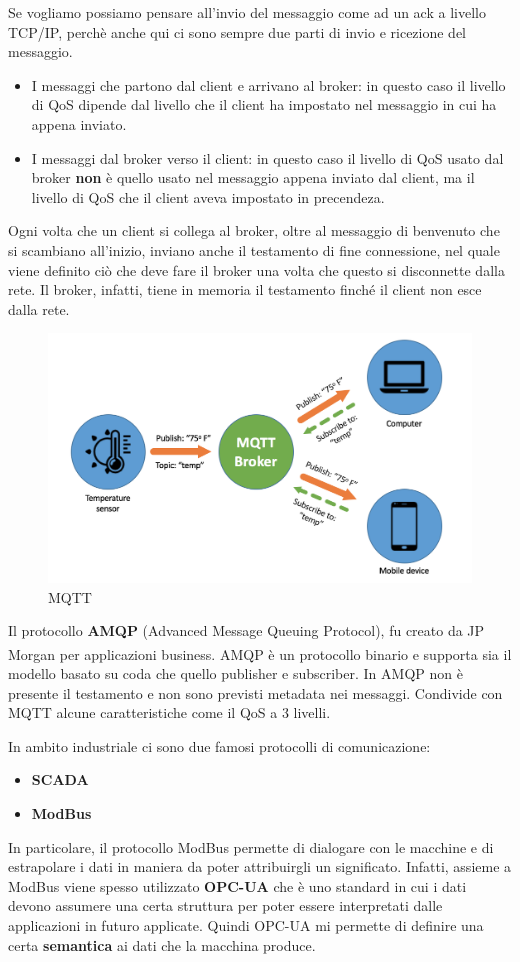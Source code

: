 \documentclass[10pt,a4paper,oneside]{scrbook}
\begin{document}
Se vogliamo possiamo pensare all'invio del messaggio come ad un ack a livello TCP/IP, perchè anche qui ci sono sempre due parti di invio e ricezione del messaggio.
\begin{itemize}
    \item I messaggi che partono dal client e arrivano al broker: in questo caso il livello di QoS dipende dal livello che il client ha impostato
    nel messaggio in cui ha appena inviato.
    \item I messaggi dal broker verso il client: in questo caso il livello di QoS usato dal broker \textbf{non} è quello usato nel messaggio appena inviato dal client, 
    ma il livello di QoS che il client aveva impostato in precendeza.
\end{itemize}
Ogni volta che un client si collega al broker, oltre al messaggio di benvenuto che si scambiano all'inizio, inviano anche il testamento di fine connessione, 
nel quale viene definito ciò che deve fare il broker una volta che questo si disconnette dalla rete. Il broker, infatti, tiene in memoria il testamento finché il 
client non esce dalla rete.
\begin{figure}[h]
    \centering
    \includegraphics[width=0.6\linewidth]{img/MQTT.png}
    \caption{MQTT}
    \label{fig:MQTT}
\end{figure}

Il protocollo \textbf{AMQP} (Advanced Message Queuing Protocol), fu creato da JP Morgan\textsuperscript{\textregistered} per applicazioni business.
AMQP è un protocollo binario e supporta sia il modello basato su coda che quello publisher e subscriber. In AMQP non è presente il testamento e non
sono previsti metadata nei messaggi. Condivide con MQTT alcune caratteristiche come il QoS a 3 livelli.

In ambito industriale ci sono due famosi protocolli di comunicazione:
\begin{itemize}
    \item \textbf{SCADA}
    \item \textbf{ModBus}
\end{itemize}
In particolare, il protocollo ModBus permette di dialogare con le macchine e di estrapolare i dati in maniera da poter attribuirgli un significato.
Infatti, assieme a ModBus viene spesso utilizzato \textbf{OPC-UA} che è uno standard in cui i dati devono assumere una certa struttura per poter essere interpretati
dalle applicazioni in futuro applicate. Quindi OPC-UA mi permette di definire una certa \textbf{semantica} ai dati che la macchina produce.
\end{document}
